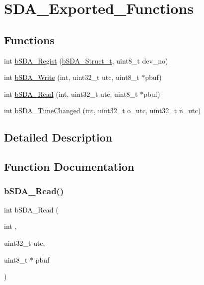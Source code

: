 \hypertarget{group___s_d_a___exported___functions}{}\section{S\+D\+A\+\_\+\+Exported\+\_\+\+Functions}
\label{group___s_d_a___exported___functions}
\subsection*{Functions}
\begin{DoxyCompactItemize}
\item 
int \mbox{\hyperlink{group___s_d_a___exported___functions_gad4f83d4a30501a5c1a14cc38738a8227}{b\+S\+D\+A\+\_\+\+Regist}} (\mbox{\hyperlink{structb_s_d_a___struct__t}{b\+S\+D\+A\+\_\+\+Struct\+\_\+t}}, uint8\+\_\+t dev\+\_\+no)
\item 
int \mbox{\hyperlink{group___s_d_a___exported___functions_ga4daee81bc3c74a158d9c1046ca4a903d}{b\+S\+D\+A\+\_\+\+Write}} (int, uint32\+\_\+t utc, uint8\+\_\+t $\ast$pbuf)
\item 
int \mbox{\hyperlink{group___s_d_a___exported___functions_ga989e491d90fefc4bd0508b0e2e11890c}{b\+S\+D\+A\+\_\+\+Read}} (int, uint32\+\_\+t utc, uint8\+\_\+t $\ast$pbuf)
\item 
int \mbox{\hyperlink{group___s_d_a___exported___functions_gafd3bff98026ad51c5a0735cd6cb99034}{b\+S\+D\+A\+\_\+\+Time\+Changed}} (int, uint32\+\_\+t o\+\_\+utc, uint32\+\_\+t n\+\_\+utc)
\end{DoxyCompactItemize}


\subsection{Detailed Description}


\subsection{Function Documentation}
\mbox{\label{group___s_d_a___exported___functions_ga989e491d90fefc4bd0508b0e2e11890c}} 
\subsubsection{\texorpdfstring{b\+S\+D\+A\+\_\+\+Read()}{bSDA\_Read()}}
{\footnotesize\ttfamily int b\+S\+D\+A\+\_\+\+Read (\begin{DoxyParamCaption}\item[{int}]{,  }\item[{uint32\+\_\+t}]{utc,  }\item[{uint8\+\_\+t $\ast$}]{pbuf }\end{DoxyParamCaption})}

